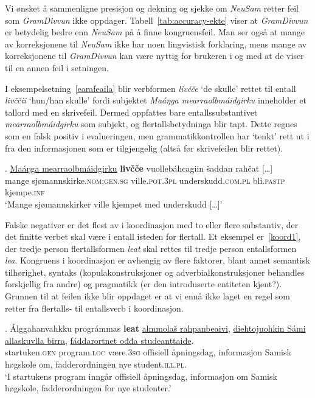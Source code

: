 \documentclass{flammie}
\begin{document}
Vi ønsket å sammenligne presisjon og dekning og sjekke om \textit{NeuSam} retter
feil som \textit{GramDivvun} ikke oppdager.  Tabell~\ref{tab:accuracy-ekte}
viser at \textit{GramDivvun} er betydelig bedre enn \textit{NeuSam} på å finne
kongruensfeil. Man ser også at mange av korreksjonene til \textit{NeuSam} ikke
har noen lingvistisk forklaring, mens mange av korreksjonene til
\textit{GramDivvun} kan være nyttig for brukeren i og med at de viser til en
annen feil i setningen.

I eksempelsetning~\ref{earafeaila} blir verbformen \textit{livčče} `de skulle'
rettet til entall \textit{livččii} `hun/han skulle' fordi subjektet
\textit{Maáŋga mearraolbmáidgirku} inneholder et tallord med en skrivefeil.
Dermed oppfattes bare entallssubstantivet \textit{mearraolbmáidgirku} som
subjekt, og flertallsbetydninga blir tapt.  Dette regnes som en falsk positiv i
evalueringen, men grammatikkontrollen har `tenkt' rett ut i fra den
informasjonen som er tilgjengelig (altså før skrivefeilen blir rettet).

\exg. \underline{Maáŋga mearraolbmáidgirku} \textbf{livčče} vuollebáhcagiin šaddan rahčat [\ldots]\label{earafeaila}\\
{mange sjømannskirke\textsc{.nom;gen.sg}} ville\textsc{.pot.3pl} underskudd\textsc{.com.pl} bli\textsc{.pastp} kjempe\textsc{.inf}\\
`Mange sjømannskirker ville kjempet med underskudd [\ldots]'


Falske negativer er det flest av i koordinasjon med to eller flere substantiv,
der det finitte verbet skal være i entall isteden for flertall. Et eksempel
er~\ref{koord1}, der tredje person flertallsformen \textit{leat} skal rettes til
tredje person entallsformen \textit{lea}. Kongruens i koordinasjon er avhengig
av flere faktorer, blant annet semantisk tilhørighet, syntaks
(kopulakonstruksjoner og adverbialkonstruksjoner behandles forskjellig fra
andre) og pragmatikk (er den introduserte entiteten kjent?).  Grunnen til at
feilen ikke blir oppdaget er at vi ennå ikke laget en regel som retter fra
flertalls- til entallsverb i koordinasjon.

\exg. Álggahanvahkku prográmmas \textbf{leat} \underline{almmolaš rahpanbeaivi}, \underline{diehtojuohkin Sámi allaskuvlla birra}, \underline{fáddarortnet ođđa studeanttaide}.\label{koord1}\\
startuken\textsc{.gen} program\textsc{.loc} være\textsc{.3sg} {offisiell åpningsdag}, {informasjon Samisk høgskole om}, {fadderordningen nye student\textsc{.ill.pl}}.\\
`I startukens program inngår offisiell åpningsdag, informasjon om Samisk høgskole, fadderordningen for nye studenter.'
\end{document}
